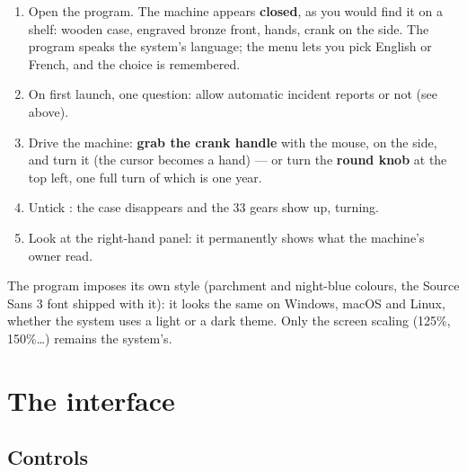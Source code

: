 \begin{enumerate}
  \item Open the program. The machine appears \textbf{closed}, as you would find it on a
        shelf: wooden case, engraved bronze front, hands, crank on the side. The program
        speaks the system's language; the  menu lets you pick English or
        French, and the choice is remembered.
  \item On first launch, one question: allow automatic incident reports or not (see above).
  \item Drive the machine: \textbf{grab the crank handle} with the mouse, on the side, and
        turn it (the cursor becomes a hand) — or turn the \textbf{round knob} at the top left,
        one full turn of which is one year.
  \item Untick : the case disappears and the 33 gears show up, turning.
  \item Look at the right-hand panel: it permanently shows what the machine's owner read.
\end{enumerate}


\begin{astuce}
The program imposes its own style (parchment and night-blue colours, the Source Sans 3 font
shipped with it): it looks the same on Windows, macOS and Linux, whether the system uses a
light or a dark theme. Only the screen scaling (125\%, 150\%…) remains the system's.
\end{astuce}

\section{The interface}

\subsection{Controls}

